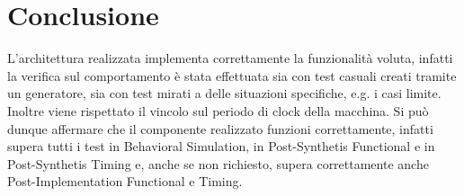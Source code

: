 \section{Conclusione}
L'architettura realizzata implementa correttamente la funzionalità voluta, infatti la verifica sul comportamento è stata effettuata sia con test casuali creati tramite un generatore, sia con test mirati a delle situazioni specifiche, e.g. i casi limite. Inoltre viene rispettato il vincolo sul periodo di clock della macchina.
Si può dunque affermare che il componente realizzato funzioni correttamente, infatti supera tutti i test in Behavioral Simulation, in Post-Synthetis Functional e in Post-Synthetis Timing e, anche se non richiesto, supera correttamente anche Post-Implementation Functional e Timing.



